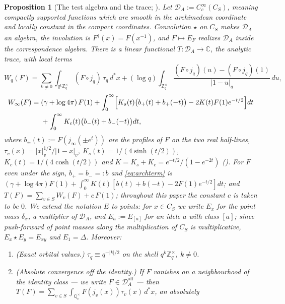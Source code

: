 \documentclass[11pt]{amsart}
\newtheorem{proposition}[theorem]{Proposition}
\theoremstyle{definition}
\theoremstyle{remark}
\newcommand{\C}{\mathbb C}
\newcommand{\Z}{\mathbb Z}
\newcommand{\Q}{\mathbb Q}
\newcommand{\DA}{\mathcal D_A}
\newcommand{\Doff}{\mathcal D_A^{\mathrm{off}}}
\begin{document}
\begin{proposition}[The test algebra and the trace;
{\cite[\S6, Def.~6.5, Conv.~6.6, Thm.~6.7, \S11, Thm.~11.6]{Companion}}]\label{prop:trace}
Let $\DA:=C_c^\infty(C_S)$, meaning compactly supported functions which are
smooth in the archimedean coordinate and locally constant in the compact
coordinates. Convolution $\star$ on $C_S$ makes $\DA$ an algebra, the
involution is $F^\dagger(x)=\overline{F(x^{-1})}$, and $F\mapsto E_F$ realizes
$\DA$ inside the correspondence algebra. There is a linear functional
$T:\DA\to\C$, the analytic trace, with local terms
\begin{equation}\label{eq:localterms}
  W_q(F)=\sum_{k\ne0}\int_{q^k\Z_q^\times}(F\circ j_q)\,\tau_q\,d^*x
   +(\log q)\int_{\Z_q^\times}\frac{(F\circ j_q)(u)-(F\circ j_q)(1)}{|1-u|_q}
     \,du,
\end{equation}
\begin{equation}\label{eq:archterm}
\begin{aligned}
  W_\infty(F)={}&(\gamma+\log4\pi)\,F(1)
   +\int_0^\infty\Bigl[K_s(t)\bigl(b_+(t)+b_+(-t)\bigr)
     -2K(t)F(1)e^{-t/2}\Bigr]dt\\
   &+\int_0^\infty K_c(t)\bigl(b_-(t)+b_-(-t)\bigr)dt,
\end{aligned}
\end{equation}
where $b_\pm(t):=F(j_\infty(\pm e^{t}))$ are the profiles of $F$ on the two
real half-lines, $\tau_v(x)=|x|_v^{1/2}/|1-x|_v$,
$K_s(t)=1/(4\sinh(t/2))$, $K_c(t)=1/(4\cosh(t/2))$ and
$K=K_s+K_c=e^{-t/2}/(1-e^{-2t})$ (\cite[Def.~6.5 and Convention~6.6]{Companion}). For $F$ even under the sign, $b_+=b_-=:b$ and
\eqref{eq:archterm} is $(\gamma+\log4\pi)F(1)+\int_0^\infty
K(t)[b(t)+b(-t)-2F(1)e^{-t/2}]dt$; and $T(F)=\sum_{v\in S}W_v(F)+c\,F(1)$; throughout
this paper the constant $c$ is taken to be $0$. We extend the notation $E$ to
points: for $x\in C_S$ we write $E_x$ for the point mass $\delta_x$, a
multiplier of $\DA$, and $E_a:=E_{[a]}$ for an idele $a$ with class $[a]$;
since push-forward of point masses along the multiplication of $C_S$ is
multiplicative, $E_x\star E_y=E_{xy}$ and $E_1=\Delta$. Moreover:
\begin{enumerate}
\item[(a)] \emph{(Exact orbital values.)} $\tau_q\equiv q^{-|k|/2}$ on the
shell $q^k\Z_q^\times$, $k\ne0$.
\item[(b)] \emph{(Absolute convergence off the identity.)} If $F$ vanishes on
a neighbourhood of the identity class --- we write $F\in\Doff$ --- then
$T(F)=\sum_{v\in S}\int_{\Q_v^\times}F(j_v(x))\tau_v(x)\,d^*x$, an absolutely

\end{enumerate}
\end{proposition}
\end{document}
